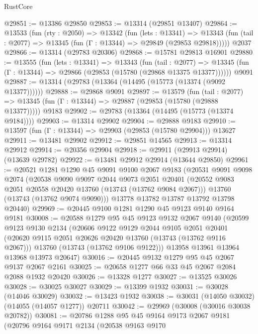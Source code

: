 \begin{lexlean}{RustCore}
\begin{coremodule}
@29851 := @13386 @29850
@29853 := @13314 (@29851 @13407)
@29864 := @13533
    (fun (rty : @2050) =>
    @13342
      (fun (lets : @13341) =>
      @13343 (fun (tail : @2077) => @13345 (fun (Γ : @13344) => @29849 (@29853 @29818)))))
    @2037
@29866 := @13314 (@29783 @20306)
@29868 := @15781 @29813 @16901
@29880 := @13555
    (fun (lets : @13341) =>
    @13343
      (fun (tail : @2077) =>
      @13345 (fun (Γ : @13344) => @29866 (@29853 (@15780 (@29868 @13375 @13377))))))
    @9091
@29887 := @13314 (@29783 (@13364 (@14495 (@15773 (@13374 (@9092 @13377))))))
@29888 := @29868 @9091
@29897 := @13579
    (fun (tail : @2077) => @13345 (fun (Γ : @13344) => @29887 (@29853 (@15780 (@29888 @13377)))))
    @9183
@29902 := @29783 (@13364 (@14495 (@15773 (@13374 @9184))))
@29903 := @13314 @29902
@29904 := @29888 @9183
@29910 := @13597 (fun (Γ : @13344) => @29903 (@29853 (@15780 @29904))) @13627
@29911 := @13481 @29902
@29912 := @29851 @14565
@29913 := @13314 @29912
@29914 := @20356 @29904
@29918 := @29911 (@29913 @29914) (@13639 @29782)
@29922 := @13481 @29912 @29914 (@13644 @29850)
@29961 := @20521
    @1281
    @1290
    @45
    @9091
    @9100
    @2067
    @9183
    (@20531
      @9091
      @9098
      @2074
      (@20538
        @9090
        @9097
        @2044
        @9073
        @2051
        @20401
        (@20552 @9083 @2051 @20558 @20420 @13760 (@13743 (@13762 @9084 @2067)))
        @13760
        (@13743 (@13762 @9074 @9090)))
      @13778
      @13782
      @13787
      @13792
      @13798
      @20440)
@29969 := @20445 @9100 @1281 @1290 @45 @9123 @9140 @9164 @9181
@30008 := @20588
    @1279
    @95
    @45
    @9123
    @9132
    @2067
    @9140
    (@20599
      @9123
      @9130
      @2134
      (@20606
        @9122
        @9129
        @2044
        @9105
        @2051
        @20401
        (@20620 @9115 @2051 @20626 @20420 @13760 (@13743 (@13762 @9116 @2067)))
        @13760
        (@13743 (@13762 @9106 @9122)))
      @13958
      @13961
      @13964
      @13968
      @13973
      @20647)
@30016 := @20445 @9132 @1279 @95 @45 @2067 @9137 @2067 @2161
@30025 := @20658 @1277 @66 @33 @45 @2067 @2084 @2088 @1932 @20420
@30026 := @13328 @1277
@30027 := @13525 @30026
@30028 := @30025 @30027
@30029 := @13399 @1932
@30031 := @30028 (@14046 @30029)
@30032 := @13423 @1932
@30038 := @30031 (@14050 @30032) (@14055 (@14057 @1277)) @20711
@30042 := @29969 (@30008 (@30016 @30038 @20782))
@30081 := @20786
    @1288
    @95
    @45
    @9164
    @9173
    @2067
    @9181
    (@20796
      @9164
      @9171
      @2134
      (@20538
        @9163
        @9170

\end{coremodule}
\end{lexlean}
